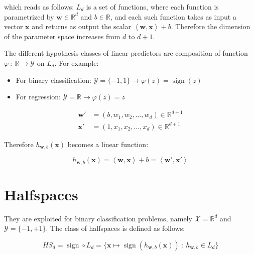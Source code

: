 \documentclass[../../main/main.tex]{subfiles}
\begin{document}
which reads as follows: \( L_d \) is a set of functions, where each function is parametrized by \( \mathbf{w} \in \mathbb{R}^d \) and \( b \in \mathbb{R} \), and each such function takes as input a vector \( \mathbf{x} \) and returns as output the scalar \( \left\langle \mathbf{w}, \mathbf{x} \right\rangle + b \). Therefore the dimension of the parameter space increases from \( d \) to \( d+1 \).

The different hypothesis classes of linear predictors are composition of function \( \varphi \ : \ \mathbb{R} \to \mathcal{Y} \) on \( L_d \). For example:
\begin{itemize}
    \item For binary classification: \( \mathcal{Y} = \{-1,1\} \to \varphi(z) = \operatorname{sign}(z) \)
    \item For regression: \( \mathcal{Y} = \mathbb{R} \to \varphi(z) = z \)
\end{itemize}

\begin{equation}
    \begin{aligned}
        \mathbf{w}' &= (b, w_1, w_2, \dots, w_d) \in \mathbb{R}^{d+1}   \\
        \mathbf{x}' &= (1, x_1, x_2, \dots, x_d) \in \mathbb{R}^{d+1}
    \end{aligned}
    \label{eq:C5_AFNN}
\end{equation}

Therefore \( h_{\mathbf{w},b}(\mathbf{x}) \) becomes a linear function:

\begin{equation}
    h_{\mathbf{w},b}(\mathbf{x})
    =
    \left\langle \mathbf{w}, \mathbf{x} \right\rangle + b
    =
    \left\langle \mathbf{w}', \mathbf{x}' \right\rangle
    \label{eq:C5_AFNN_2}
\end{equation}





\section{Halfspaces}
They are exploited for binary classification problems, namely \( \mathcal{X} = \mathbb{R}^d \) and \( \mathcal{Y} = \{-1,+1\} \). The class of halfspaces is defined as follows:

\begin{equation}
    H S_d = \operatorname{sign} \circ L_d
    =
    \{ \mathbf{x} \mapsto \operatorname{sign}(h_{\mathbf{w},b}(\mathbf{x})) \ : \ h_{\mathbf{w},b} \in L_d \}
    \label{eq:C5_CH}
\end{equation}
\end{document}
